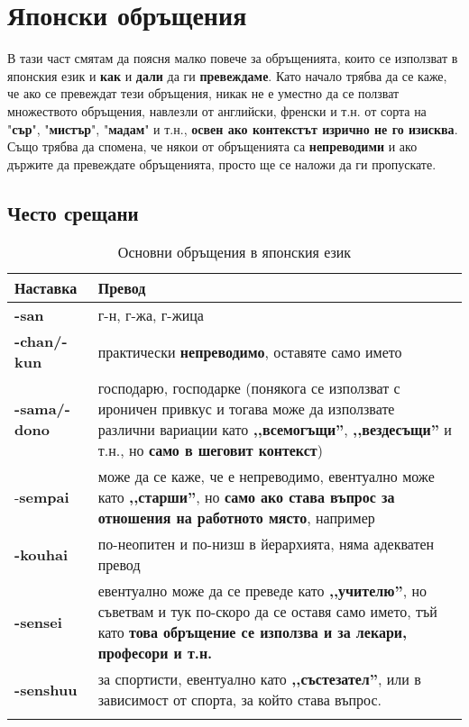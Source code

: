 \chapter{Японски обръщения}
В тази част смятам да поясня малко повече за обръщенията, които се използват
в японския език и \textbf{как} и \textbf{дали} да ги \textbf{превеждаме}. Като начало трябва да се каже,
че ако се превеждат тези обръщения, никак не е уместно да се ползват множеството обръщения, навлезли от английски, френски и т.н. от сорта на "\textbf{сър}", "\textbf{мистър}", "\textbf{мадам}" и т.н.,
\textbf{освен ако контекстът изрично не го изисква}. Също трябва да спомена, че някои от обръщенията
са \textbf{непреводими} и ако държите да превеждате обръщенията, просто ще се наложи да ги пропускате.

\section{Често срещани}
\begin{longtable}{|p{}|p{}|}
\hline
\textbf{Наставка} & \textbf{Превод} \\ \hline
\endfirsthead
\hline
\endhead
\hline
\endfoot

\textbf{-san}& г-н, г-жа, г-жица \\
\textbf{-chan/-kun}& практически \textbf{непреводимо}, оставяте само името \\
\textbf{-sama/-dono}& господарю, господарке (понякога се използват с ироничен привкус и тогава може да използвате различни вариации като \textbf{,,всемогъщи''}, \textbf{,,вездесъщи''} и т.н., но \textbf{само в шеговит контекст}) \\
-\textbf{sempai}& може да се каже, че е непреводимо, евентуално може като \textbf{,,старши''}, но \textbf{само ако става въпрос за отношения на работното място}, например \\
\textbf{-kouhai}& по-неопитен и по-низш в йерархията, няма адекватен превод \\
\textbf{-sensei}& евентуално може да се преведе като \textbf{,,учителю''}, но съветвам и тук по-скоро да се оставя само името, тъй като \textbf{това обръщение се използва и за лекари, професори и т.н.} \\
\textbf{-senshuu}& за спортисти, евентуално като \textbf{,,състезател''}, или в зависимост от спорта, за който става въпрос. \\

\hline\caption{Основни обръщения в японския език}

\end{longtable}

